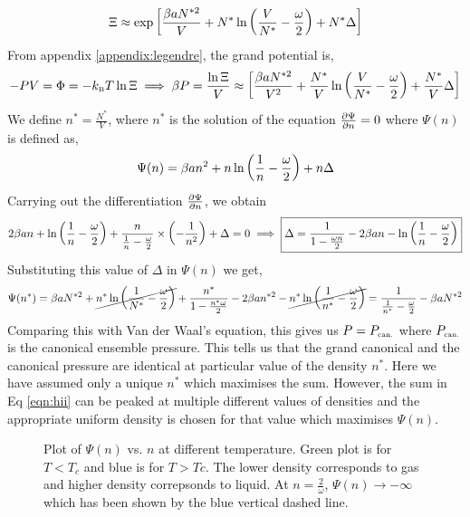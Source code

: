 \begin{equation}\label{eqn:hii}
    \Xi \approx \exp\qty[\frac{\beta a N^{*2}}{V} +N^*\ln\qty(\frac{V}{N^*}-\frac{\omega}{2}) +N^*\Delta]
\end{equation}
From appendix \ref{appendix:legendre}, the grand potential is,
\begin{align*}
    -PV = \Phi = -k_{\text{\tiny B}} T \ln \Xi \implies \beta P = \frac{\ln \Xi}{V} \approx \qty[\frac{\beta a N^{*2}}{V^2} +\frac{N^*}{V}\ln\qty(\frac{V}{N^*}-\frac{\omega}{2}) +\frac{N^*}{V}\Delta]
\end{align*}
We define $n^* = \frac{N^*}{V}$, where $n^*$ is the solution of the equation $\pdv{\Psi}{n}=0$ where $\Psi(n)$ is defined as,
$$\Psi(n) = \beta a n^2 + n\ln\qty(\frac{1}{n} - \frac{\omega}{2})+n\Delta$$
Carrying out the differentiation $\pdv{\Psi}{n}$, we obtain 
\begin{equation}\label{eqn:density}
    2\beta a n +\ln\qty(\frac{1}{n} - \frac{\omega}{2}) + \frac{n}{\frac{1}{n}- \frac{\omega}{2} }\times \qty(-\frac{1}{n^2})+\Delta =0\implies \boxed{\Delta = \frac{1}{1-\frac{\omega n}{2}}-2\beta a n - \ln\qty(\frac{1}{n}-\frac{\omega}{2})}
\end{equation}
Substituting this value of $\Delta$ in $\Psi(n)$ we get,
\begin{align*}
    \Psi(n^*) = \beta a N^{*2} + \cancel{n^*\ln\qty(\frac{1}{N^*}-\frac{\omega}{2})}+\frac{n^*}{1-\frac{n^*\omega}{2}}-2\beta a n^{*2} - \cancel{n^*\ln\qty(\frac{1}{n^*}-\frac{\omega}{2})}= \frac{1}{\frac{1}{n^*}-\frac{\omega}{2}}-\beta a N^{*2}
\end{align*}
Comparing this with Van der Waal's equation, this gives us $P = P_{\text{\tiny can.}}$ where $P_{\text{\tiny can.}}$ is the canonical ensemble pressure. This tells us that the grand canonical and the canonical pressure are identical at particular value of the density $n^*$. Here we have assumed only a unique $n^*$ which maximises the sum. However, the sum in Eq \eqref{eqn:hii} can be peaked at multiple different values of densities and the appropriate uniform density is chosen for that value which maximises $\Psi(n)$.
\begin{figure}[H]
    \centering 
    
    \caption{Plot of $\Psi(n)$ vs. $n$ at different temperature. Green plot is for $T<T_c$ and blue is for $T>Tc$. The lower density corresponds to gas and higher density correpsonds to liquid. At $n=\frac{2}{\omega}$, $\Psi(n)\to -\infty$ which has been shown by the blue vertical dashed line.}
\end{figure}
\noindent
